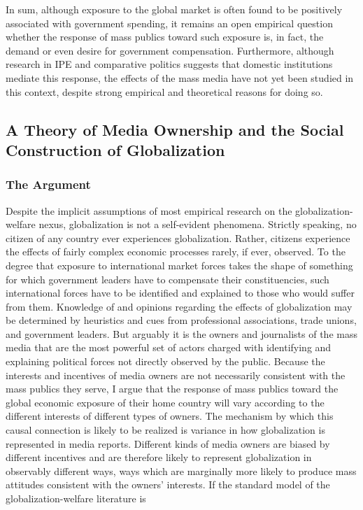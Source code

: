 \documentclass[12pt]{article}
\begin{document}
	In sum, although exposure to the global market is often found to be positively associated with government spending, it remains an open empirical question whether the response of mass publics toward such exposure is, in fact, the demand or even desire for government compensation. Furthermore, although research in IPE and comparative politics suggests that domestic institutions mediate this response, the effects of the mass media have not yet been studied in this context, despite strong empirical and theoretical reasons for doing so.

\subsection{A Theory of Media Ownership and the Social Construction of Globalization}
\subsubsection{The Argument}

	Despite the implicit assumptions of most empirical research on the globalization-welfare nexus, globalization is not a self-evident phenomena. Strictly speaking, no citizen of any country ever experiences globalization. Rather, citizens experience the effects of fairly complex economic processes rarely, if ever, observed. To the degree that exposure to international market forces takes the shape of something for which government leaders have to compensate their constituencies, such international forces have to be identified and explained to those who would suffer from them. Knowledge of and opinions regarding the effects of globalization may be determined by heuristics and cues from professional associations, trade unions, and government leaders. But arguably it is the owners and journalists of the mass media that are the most powerful set of actors charged with identifying and explaining political forces not directly observed by the public. Because the interests and incentives of media owners are not necessarily consistent with the mass publics they serve, I argue that the response of mass publics toward the global economic exposure of their home country will vary according to the different interests of different types of owners. The mechanism by which this causal connection is likely to be realized is variance in how globalization is represented in media reports.
	Different kinds of media owners are biased by different incentives and are therefore likely to represent globalization in observably different ways, ways which are marginally more likely to produce mass attitudes consistent with the owners' interests. If the standard model of the globalization-welfare literature is 
\end{document}
